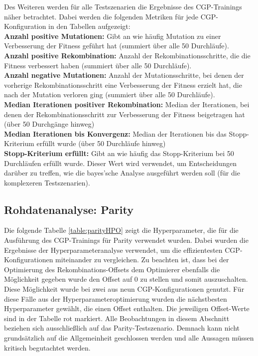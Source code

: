 Des Weiteren werden für alle Testszenarien die Ergebnisse des CGP-Trainings näher betrachtet.
Dabei werden die folgenden Metriken für jede CGP-Konfiguration in den Tabellen aufgezeigt:\\
\textbf{Anzahl positive Mutationen:} Gibt an wie häufig Mutation zu einer Verbesserung der Fitness geführt hat (summiert über alle 50 Durchläufe).\\
\textbf{Anzahl positive Rekombination:} Anzahl der Rekombinationsschritte, die die Fitness verbessert haben (summiert über alle 50 Durchläufe).\\
\textbf{Anzahl negative Mutationen:} Anzahl der Mutationsschritte, bei denen der vorherige Rekombinationsschritt eine Verbesserung der Fitness erzielt hat, die nach der Mutation verloren ging (summiert über alle 50 Durchläufe).\\
\textbf{Median Iterationen positiver Rekombination:} Median der Iterationen, bei denen der Rekombinationsschritt zur Verbesserung der Fitness beigetragen hat (über 50 Durchgänge hinweg)\\
\textbf{Median Iterationen bis Konvergenz:} Median der Iterationen bis das Stopp-Kriterium erfüllt wurde (über 50 Durchläufe hinweg)\\
\textbf{Stopp-Kriterium erfüllt:} Gibt an wie häufig das Stopp-Kriterium bei 50 Durchläufen erfüllt wurde. Dieser Wert wird verwendet, um Entscheidungen darüber zu treffen, wie die bayes'sche Analyse ausgeführt werden soll (für die komplexeren Testszenarien).

\subsection{Rohdatenanalyse: Parity}
\label{subsec:rohdatenParity}

Die folgende Tabelle \ref{table:parityHPO} zeigt die Hyperparameter, die für die Ausführung des CGP-Trainings für Parity verwendet wurden.
Dabei wurden die Ergebnisse der Hyperparameteranalyse verwendet, um die effizientesten CGP-Konfigurationen miteinander zu vergleichen.
Zu beachten ist, dass bei der Optimierung des Rekombinations-Offsets dem Optimierer ebenfalls die Möglichkeit gegeben wurde den Offset auf 0 zu stellen und somit auszuschalten.
Diese Möglichkeit wurde bei zwei aus neun CGP-Konfigurationen genutzt.
Für diese Fälle aus der Hyperparameteroptimierung wurden die nächstbesten Hyperparameter gewählt, die einen Offset enthalten.
Die jeweiligen Offset-Werte sind in der Tabelle rot markiert.
Alle Beobachtungen in diesem Abschnitt beziehen sich ausschließlich auf das Parity-Testszenario.
Demnach kann nicht grundsätzlich auf die Allgemeinheit geschlossen werden und alle Aussagen müssen kritisch begutachtet werden.

